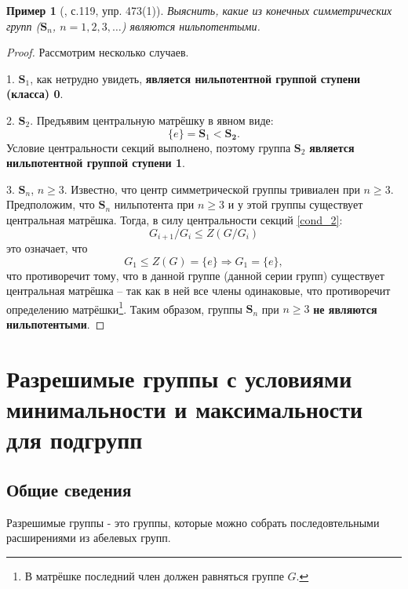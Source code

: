 \documentclass{article}
\newtheorem{example}{Пример}[section]
\begin{document}
\begin{example}[\cite{lyapin}, с.119, упр. 473(1)] \label{xmeaskl}
    Выяснить, какие из конечных симметрических групп ($\mathbf{S}_n$, $n = 1, 2, 3, \ldots$) являются нильпотентыми.
\end{example}
\begin{proof}
    Рассмотрим несколько случаев.

    1. $\mathbf{S}_1$, как нетрудно увидеть, \textbf{является нильпотентной группой ступени (класса) 0}.
    
    2. $\mathbf{S}_2$. Предъявим центральную матрёшку в явном виде: $$ \{ e \} = \mathbf{S}_1 < \mathbf{S_2}. $$ Условие центральности секций выполнено, поэтому группа $\mathbf{S}_2$ \textbf{является нильпотентной группой ступени 1}.
    
    3. $\mathbf{S}_n$, $n \geqslant 3$. Известно, что центр симметрической группы тривиален при $n \geqslant 3$. Предположим, что $\mathbf{S}_n$ нильпотента при $n \geqslant 3$ и у этой группы существует центральная матрёшка. Тогда, в силу центральности секций \eqref{cond_2}: $$ G_{i + 1}/ G_i \leqslant Z(G / G_i) $$ это означает, что $$ G_1 \leqslant Z(G) = \{ e \} \Rightarrow G_1 = \{e\}, $$ что противоречит тому, что в данной группе (данной серии групп) существует центральная матрёшка -- так как в ней все члены одинаковые, что противоречит определению матрёшки\footnote{В матрёшке последний член должен равняться группе $G$.}. Таким образом, группы $\mathbf{S}_n$ при $n \geqslant 3$ \textbf{не являются нильпотентыми}.
\end{proof}

\newpage

\section{Разрешимые группы с условиями минимальности и максимальности для подгрупп}

\subsection{Общие сведения}

Разрешимые группы - это группы, которые можно собрать последовтельными расширениями из абелевых групп.
\end{document}

